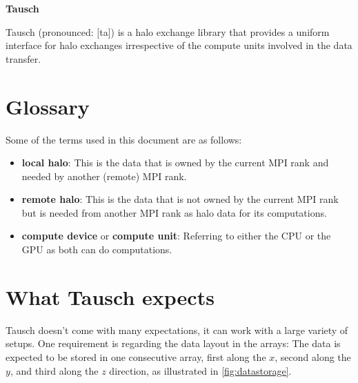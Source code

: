 \documentclass{article}
\begin{document}

\begin{center}\Huge\bfseries
    Tausch
\end{center}

\vspace{4mm}


Tausch (pronounced: [ta\textupsilon\textesh]) is a halo exchange library that provides a uniform interface for halo exchanges irrespective of the compute units involved in the data transfer.

\section{Glossary}

Some of the terms used in this document are as follows:
\begin{itemize}
    \item \textbf{local halo}: This is the data that is owned by the current MPI rank and needed by another (remote) MPI rank.
    \item \textbf{remote halo}: This is the data that is not owned by the current MPI rank but is needed from another MPI rank as halo data for its computations.
    \item \textbf{compute device} or \textbf{compute unit}: Referring to either the CPU or the GPU as both can do computations.
\end{itemize}

\section{What Tausch expects}

Tausch doesn't come with many expectations, it can work with a large variety of setups. One requirement is regarding the data layout in the arrays: The data is expected to be stored in one consecutive array, first along the $x$, second along the $y$, and third along the $z$ direction, as illustrated in \autoref{fig:datastorage}.
\end{document}
